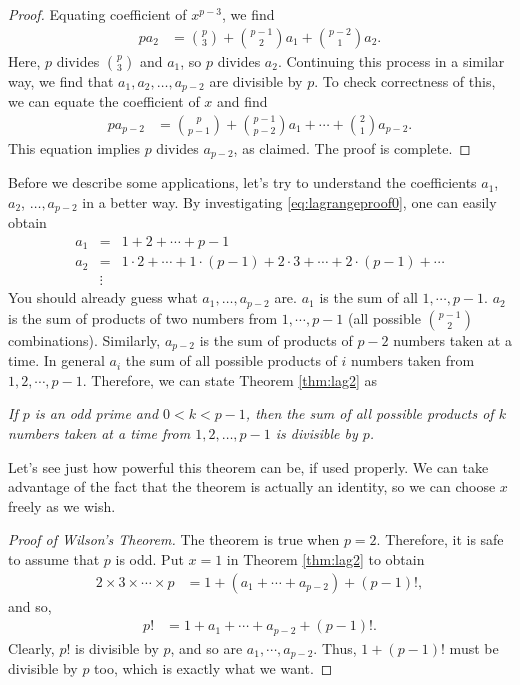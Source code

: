 \documentclass[12pt]{subfile}
\begin{document}
\begin{proof}[Proof]
			Equating coefficient of $x^{p-3}$, we find
				\begin{align*}
					pa_2 & = \binom{p}{3}+\binom{p-1}{2}a_1+\binom{p-2}{1}a_2.
				\end{align*}
			Here, $p$ divides $\binom{p}{3}$ and $a_1$, so $p$ divides $a_2$. Continuing this process in a similar way, we find that $a_1, a_2, \ldots, a_{p-2}$ are divisible by $p$. To check correctness of this, we can equate the coefficient of $x$ and find
				\begin{align*}
					pa_{p-2} & = \binom{p}{p-1}+\binom{p-1}{p-2}a_1+\cdots+\binom{2}{1}a_{p-2}.
				\end{align*}
			This equation implies $p$ divides $a_{p-2}$, as claimed. The proof is complete.
		\end{proof}
	Before we describe some applications, let's try to understand the coefficients $a_1$, $a_2$, $\ldots,a_{p-2}$ in a better way. By investigating \eqref{eq:lagrangeproof0}, one can easily obtain
		\begin{eqnarray*}
			a_1 & = & 1+2+\cdots+p-1\\
			a_2 & = & 1\cdot2+\cdots+1\cdot(p-1)+2\cdot3+\cdots+2\cdot(p-1)+\cdots\\
				&  \vdots &
		\end{eqnarray*}
	You should already guess what $a_1,\ldots,a_{p-2}$ are. $a_1$ is the sum of all $1,\cdots,p-1$. $a_2$ is the sum of products of two numbers from $1,\cdots,p-1$ (all possible $\binom{p-1}{2}$ combinations). Similarly, $a_{p-2}$ is the sum of products of $p-2$ numbers taken at a time. In general $a_i$ the sum of all possible products of $i$ numbers taken from $1,2,\cdots,p-1$. Therefore, we can state Theorem \ref{thm:lag2} as
		\begin{theorem}\slshape
			If $p$ is an odd prime and $0<k<p-1$, then the sum of all possible products of $k$ numbers taken at a time from $1,2,\ldots,p-1$ is divisible by $p$.
		\end{theorem}
	Let's see just how powerful this theorem can be, if used properly. We can take advantage of the fact that the theorem is actually an identity, so we can choose $x$ freely as we wish.
		\begin{proof}[Proof of Wilson's Theorem]
			The theorem is true when $p=2$. Therefore, it is safe to assume that $p$ is odd. Put $x=1$ in Theorem \ref{thm:lag2} to obtain
				\begin{align*}
					2\times 3 \times \cdots \times p & = 1+(a_1+\cdots+a_{p-2})+(p-1)!,
				\end{align*}
			and so,
				\begin{align*}
					p! & = 1+a_1+\cdots+a_{p-2}+(p-1)!.
				\end{align*}
			Clearly, $p!$ is divisible by $p$, and so are $a_1,\cdots,a_{p-2}$. Thus, $1+(p-1)!$ must be divisible by $p$ too, which is exactly what we want.
		\end{proof}
\end{document}
